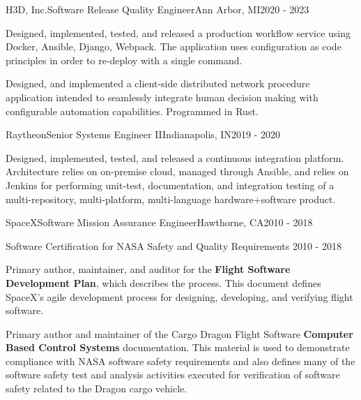 \begin{cventries}
  \cventry
  {H3D, Inc.}{Software Release Quality Engineer}{Ann Arbor, MI}{2020 - 2023}
  {
    \begin{cvitems}
    \item Designed, implemented, tested, and released a production workflow service using
      Docker, Ansible, Django, Webpack. The application uses configuration as code principles in
      order to re-deploy with a single command.
    \item Designed, and implemented a client-side distributed network procedure application intended
      to seamlessly integrate human decision making with configurable automation
      capabilities. Programmed in Rust.
    \end{cvitems}
  }

  \cventry
  {Raytheon}{Senior Systems Engineer II}{Indianapolis, IN}{2019 - 2020}
  {
    \begin{cvitems}
    \item Designed, implemented, tested, and released a continuous integration
      platform. Architecture relies on on-premise cloud, managed through Ansible, and relies on
      Jenkins for performing unit-test, documentation, and integration testing of a
      multi-repository, multi-platform, multi-language hardware+software product.
    \end{cvitems}
  }

  \cventry
  {SpaceX}{Software Mission Assurance Engineer}{Hawthorne, CA}{2010 - 2018}
  {}

  \cventry
  {Software Certification for NASA Safety and Quality Requirements}
  {}{}{2010 - 2018}
  {
    \begin{cvitems}
    \item Primary author, maintainer, and auditor for the \textbf{Flight Software Development Plan},
      which describes the process. This document defines SpaceX's agile development process for
      designing, developing, and verifying flight software.
    \item Primary author and maintainer of the Cargo Dragon Flight Software \textbf{Computer Based
      Control Systems} documentation. This material is used to demonstrate compliance with NASA
      software safety requirements and also defines many of the software safety test and analysis
      activities executed for verification of software safety related to the Dragon cargo
      vehicle.
    \end{cvitems}
  }



\end{cventries}

